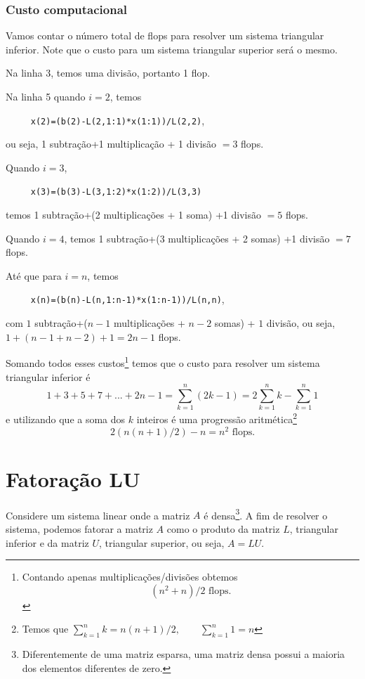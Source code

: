 \subsubsection{Custo computacional}
Vamos contar o número total de flops para resolver um sistema triangular inferior. Note que o custo para um sistema triangular superior será o mesmo.

Na linha 3, temos uma divisão, portanto 1 flop.

Na linha 5 quando $i=2$, temos

\verb#     x(2)=(b(2)-L(2,1:1)*x(1:1))/L(2,2)#,

ou seja, 1 subtração+1 multiplicação + 1 divisão $=3$ flops.

Quando $i=3$,

\verb#     x(3)=(b(3)-L(3,1:2)*x(1:2))/L(3,3)#

temos 1 subtração+(2 multiplicações + 1 soma) +1 divisão $=5$ flops.

Quando $i=4$, temos 1 subtração+(3 multiplicações + 2 somas) +1 divisão $=7$ flops.

Até que para $i=n$, temos

\verb#     x(n)=(b(n)-L(n,1:n-1)*x(1:n-1))/L(n,n)#,

com $1$ subtração+($n-1$ multiplicações + $n-2$ somas) + $1$ divisão, ou seja, $1+(n-1+n-2)+1=2n-1$ flops.

Somando todos esses custos\footnote{Contando apenas multiplicações/divisões obtemos
\begin{equation}
  (n^2+n)/2  \text{~flops}.
\end{equation}} temos que o custo para resolver um sistema triangular inferior é
\begin{equation}
  1 +3+5+7+...+2n-1=  \sum_{k=1}^n(2k-1) = 2 \sum_{k=1}^nk -\sum_{k=1}^n1
\end{equation}
e utilizando que a soma dos $k$ inteiros é uma progressão aritmética\footnote{Temos que $\displaystyle \sum_{k=1}^n k =n(n+1)/2, \quad\quad \sum_{k=1}^n 1=n$}
\begin{equation}
  2 ( n(n+1)/2 ) -n=  n^2 \text{~flops}.
\end{equation}







\section{Fatoração LU}
Considere um sistema linear onde a matriz $A$ é densa\footnote{Diferentemente de uma matriz esparsa, uma matriz densa possui a maioria dos elementos diferentes de zero.}. A fim de resolver o sistema, podemos fatorar a matriz $A$ como o produto da matriz $L$, triangular inferior e da matriz $U$, triangular superior, ou seja, $A=LU$.

